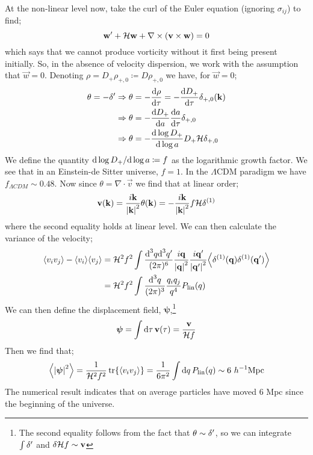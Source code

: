 \paraskip
At the non-linear level now, take the curl of the Euler equation (ignoring $\sigma_{ij}$) to find;
\begin{equation*}
\mathbf{w}^{\prime} + \mathcal{H} \mathbf{w} + \nabla \times (\mathbf{v} \times \mathbf{w}) = 0
\end{equation*}
which says that we cannot produce vorticity without it first being present initially. So, in the absence of velocity dispersion, we work with the assumption that $\vec{w} = 0$. Denoting $\rho = D_{+}\rho_{+, 0} \coloneqq D \rho_{+, 0}$ we have, for $\vec{w} = 0$;
\begin{align*}
\theta = - \delta^{\prime} \Rightarrow \theta &= - \frac{\text{d} \rho}{\text{d} \tau} = - \frac{\text{d} D_+}{\text{d} \tau}\delta_{+,0}(\mathbf{k}) \\
\Rightarrow \theta &= -\frac{\text{d} D_+}{\text{d} a}\frac{\text{d} a}{\text{d} \tau} \delta_{+,0} \\
\Rightarrow \theta &= -\frac{\text{d} \log D_+}{\text{d} \log a}D_+ \mathcal{H} \delta_{+,0}
\end{align*}
We define the quantity $\text{d} \log D_+/\text{d} \log a \coloneqq f$ as the logarithmic growth factor. We see that in an Einstein-de Sitter universe, $f = 1$. In the $\Lambda$CDM paradigm we have $f_{\Lambda CDM} \sim 0.48$. Now since $\theta = \nabla \cdot \vec{v}$ we find that at linear order;
\begin{equation}
\vec{v}(\vec{k}) = \frac{i\vec{k}}{\abs{\vec{k}}^2}\theta(\vec{k}) = -\frac{i\vec{k}}{\abs{\vec{k}}^2}f\hamilt \delta^{(1)}
\end{equation}
where the second equality holds at linear level. We can then calculate the variance of the velocity;
\begin{align*}
\left< v_i v_j \right> - \left< v_i \right>\left< v_j \right> &= \hamilt^2 f^2 \int{\frac{\ud^3 q \ud^3 q\pr}{(2\pi)^6}\frac{i\vec{q}}{\abs{\vec{q}}^2}\frac{i\vec{q}\pr}{\abs{\vec{q}\pr}^2}\left< \delta^{(1)}(\vec{q})\delta^{(1)}(\vec{q}\pr) \right>} \\
&= \hamilt^2 f^2 \int{\frac{\ud^3 q}{(2\pi)^3}\frac{q_i q_j}{q^4}P_{\text{lin}}(q)}
\end{align*}
We can then define the displacement field, $\bm{\psi}$,\footnote{The second equality follows from the fact that $\theta \sim \delta^{\prime}$, so we can integrate $\int{\delta^{\prime}}$ and $\delta \mathcal{H} f \sim \mathbf{v}$}
\begin{equation*}
\bm{\psi} = \int{\text{d}\tau \,\mathbf{v}(\tau)} = \frac{\mathbf{v}}{\mathcal{H} f}
\end{equation*}
Then we find that;
\begin{equation*}
\left< \abs{\bm{\psi}}^2 \right> = \frac{1}{\hamilt^2 f^2}\tr{\left< v_i v_j \right>} = \frac{1}{6\pi^2}\int{\upd{q}P_{\text{lin}}(q)} \sim 6 \,\,h^{-1}\text{Mpc}
\end{equation*}
The numerical result indicates that on average particles have moved $6$ Mpc since the beginning of the universe.
